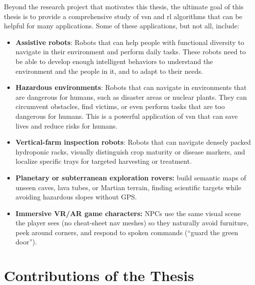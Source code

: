 Beyond the research project that motivates this thesis, the ultimate goal of this thesis is to provide a comprehensive study of \acrshort{vsn} and \acrshort{rl} algorithms that can be helpful for many applications.
Some of these applications, but not all, include:
\begin{itemize}
    \item \textbf{Assistive robots}: Robots that can help people with functional diversity to navigate in their environment and perform daily tasks.
    These robots need to be able to develop enough intelligent behaviors to understand the environment and the people in it, and to adapt to their needs.
    \item \textbf{Hazardous environments}: Robots that can navigate in environments that are dangerous for humans, such as disaster areas or nuclear plants.
    They can circumvent obstacles, find victims, or even perform tasks that are too dangerous for humans.
    This is a powerful application of \acrshort{vsn} that can save lives and reduce risks for humans.
    \item \textbf{Vertical-farm inspection robots}: Robots that can navigate densely packed hydroponic racks, visually distinguish crop maturity or disease markers, and localize specific trays for targeted harvesting or treatment.
    \item \textbf{Planetary or subterranean exploration rovers:} build semantic maps of unseen caves, lava tubes, or Martian terrain, finding scientific targets while avoiding hazardous slopes without GPS\@.
    \item \textbf{Immersive VR/AR game characters:} NPCs use the same visual scene the player sees (no cheat-sheet nav meshes) so they naturally avoid furniture, peek around corners, and respond to spoken commands (“guard the green door”).
\end{itemize}

\section{Contributions of the Thesis}\label{sec:contributions-of-the-thesis}

